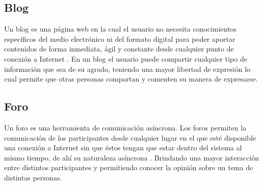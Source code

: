 \subsection{Blog}
Un blog es una página web en la cual el usuario no necesita conocimientos específicos del medio electrónico ni del 
formato digital para poder aportar contenidos de forma inmediata, ágil y constante desde cualquier punto de conexión 
a Internet \cite{catorce}. En un blog el usuario puede compartir cualquier tipo de información que sea de su agrado, 
teniendo una mayor libertad de expresión lo cual permite que otras personas compartan y comenten su manera de expresarse.

\subsection{Foro}
Un foro es una herramienta de comunicación asíncrona. Los foros permiten la comunicación de los participantes desde 
cualquier lugar en el que  esté  disponible  una  conexión  a Internet  sin  que  éstos  tengan  que  estar dentro del 
sistema al mismo tiempo, de ahí su naturaleza asíncrona \cite{quince}. Brindando una mayor interacción entre distintos 
participantes y permitiendo conocer la opinión sobre un tema de distintas personas.


